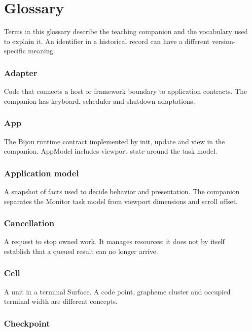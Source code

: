 \chapter{Glossary}\label{book-glossary}

Terms in this glossary describe the teaching companion and the vocabulary used to explain it. An identifier in a historical record can have a different version-specific meaning.

\subsection{Adapter}

Code that connects a host or framework boundary to application contracts. The companion has keyboard, scheduler and shutdown adaptations.

\subsection{App}

The Bijou runtime contract implemented by init, update and view in the companion. AppModel includes viewport state around the task model.

\subsection{Application model}

A snapshot of facts used to decide behavior and presentation. The companion separates the Monitor task model from viewport dimensions and scroll offset.

\subsection{Cancellation}

A request to stop owned work. It manages resources; it does not by itself establish that a queued result can no longer arrive.

\subsection{Cell}

A unit in a terminal Surface. A code point, grapheme cluster and occupied terminal width are different concepts.

\subsection{Checkpoint}

